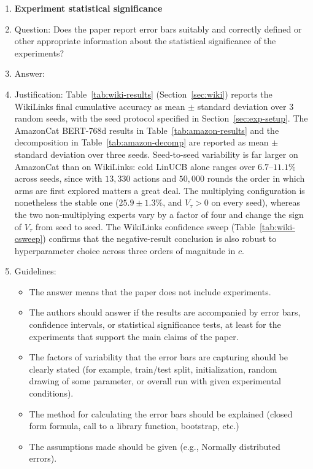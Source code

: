\documentclass{article}
\theoremstyle{definition}
\theoremstyle{remark}
\theoremstyle{remark}
\begin{document}
\begin{enumerate}
\item {\bf Experiment statistical significance}
    \item[] Question: Does the paper report error bars suitably and correctly defined or other appropriate information about the statistical significance of the experiments?
    \item[] Answer: \answerYes{} %
    \item[] Justification: Table~\ref{tab:wiki-results} (Section~\ref{sec:wiki}) reports the WikiLinks final cumulative accuracy as mean $\pm$ standard deviation over 3 random seeds, with the seed protocol specified in Section~\ref{sec:exp-setup}. The AmazonCat BERT-768d results in Table~\ref{tab:amazon-results} and the decomposition in Table~\ref{tab:amazon-decomp} are reported as mean $\pm$ standard deviation over three seeds. Seed-to-seed variability is far larger on AmazonCat than on WikiLinks: cold LinUCB alone ranges over $6.7$--$11.1\%$ across seeds, since with $13{,}330$ actions and $50{,}000$ rounds the order in which arms are first explored matters a great deal. The multiplying configuration is nonetheless the stable one ($25.9\pm1.3\%$, and $V_\tau>0$ on every seed), whereas the two non-multiplying experts vary by a factor of four and change the sign of $V_\tau$ from seed to seed. The WikiLinks confidence sweep (Table~\ref{tab:wiki-csweep}) confirms that the negative-result conclusion is also robust to hyperparameter choice across three orders of magnitude in $c$.
    \item[] Guidelines:
    \begin{itemize}
        \item The answer \answerNA{} means that the paper does not include experiments.
        \item The authors should answer \answerYes{} if the results are accompanied by error bars, confidence intervals, or statistical significance tests, at least for the experiments that support the main claims of the paper.
        \item The factors of variability that the error bars are capturing should be clearly stated (for example, train/test split, initialization, random drawing of some parameter, or overall run with given experimental conditions).
        \item The method for calculating the error bars should be explained (closed form formula, call to a library function, bootstrap, etc.)
        \item The assumptions made should be given (e.g., Normally distributed errors).

\end{itemize}
\end{enumerate}
\end{document}
